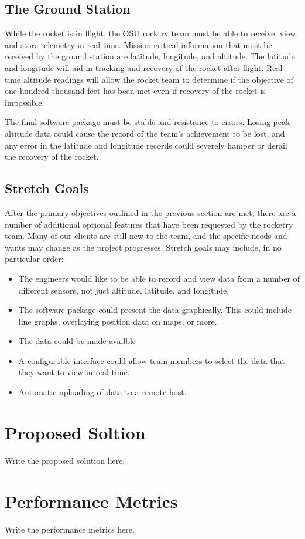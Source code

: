 \documentclass[10pt,journal,draftclsnofoot,onecolumn]{IEEEtran}
\begin{document}
\subsection{The Ground Station}
While the rocket is in flight, the \ac{OSU} rocktry team
must be able to receive, view, and store telemetry in real-time.
Mission critical information that must be received by the ground
station are latitude, longitude, and altitude. The latitude
and longitude will aid in tracking and recovery of the rocket
after flight. Real-time altitude readings will allow the rocket
team to determine if the objective of one hundred thousand feet
has been met even if recovery of the rocket is impossible.

The final software package must be stable and resistance to errors.
Losing peak altitude data could cause the record of the team's
achievement to be lost, and any error in the latitude
and longitude records could severely hamper or derail
the recovery of the rocket.

\subsection{Stretch Goals}
After the primary objectives outlined in the previous section
are met, there are a number of additional optional features
that have been requested by the rocketry team.
Many of our clients are still new to the team, and the specific
needs and wants may change as the project progresses.
Stretch goals may include, in no particular order:

\begin{itemize}
\item The engineers would like to be able to record and view data
from a number of different sensors, not just altitude,
latitude, and longitude.

\item The software package could present the data graphically.
This could include line graphs, overlaying position data
on maps, or more.

\item The data could be made availble 

\item A configurable interface could allow team members
to select the data that they want to view in real-time.

\item Automatic uploading of data to a remote host.

\end{itemize}

\section{Proposed Soltion}
Write the proposed solution here.
\section{Performance Metrics}
Write the performance metrics here.
\end{document}
